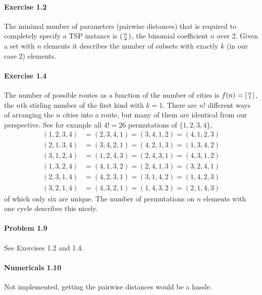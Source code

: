 \documentclass{article}
\begin{document}
\paragraph{Exercise 1.2} The minimal number of parameters (pairwise distances) that is required to completely specify a TSP instance is $\begin{psmallmatrix}
    n \\ 2
\end{psmallmatrix}$, the binomial coefficient $n$ over 2. Given a set with $n$ elements it describes the number of subsets with exactly $k$ (in our case 2) elements.

\paragraph{Exercise 1.4} The number of possible routes as a function of the number of cities is $f(n) = \begin{bsmallmatrix}n \\ 1\end{bsmallmatrix}$, the $n$th stirling number of the first kind with $k = 1$. There are $n!$ different ways of arranging the $n$ cities into a route, but many of them are identical from our perspective. See for example all $4! = 26$ permutations of $\{1, 2, 3, 4\}$,
\begin{align*}
    (1, 2, 3, 4) &= (2, 3, 4, 1) = (3, 4, 1, 2) = (4, 1, 2, 3) \\
    (2, 1, 3, 4) &= (3, 4, 2, 1) = (4, 2, 1, 3) = (1, 3, 4, 2) \\
    (3, 1, 2, 4) &= (1, 2, 4, 3) = (2, 4, 3, 1) = (4, 3, 1, 2) \\
    (1, 3, 2, 4) &= (4, 1, 3, 2) = (2, 4, 1, 3) = (3, 2, 4, 1) \\
    (2, 3, 1, 4) &= (4, 2, 3, 1) = (3, 1, 4, 2) = (1, 4, 2, 3) \\
    (3, 2, 1, 4) &= (4, 3, 2, 1) = (1, 4, 3, 2) = (2, 1, 4, 3)
\end{align*}
of which only six are unique. The number of permutations on $n$ elements with one cycle describes this nicely.

\paragraph{Problem 1.9} See Exercises 1.2 and 1.4.

\paragraph{Numericals 1.10} Not implemented, getting the pairwise distances would be a hassle.
\end{document}

